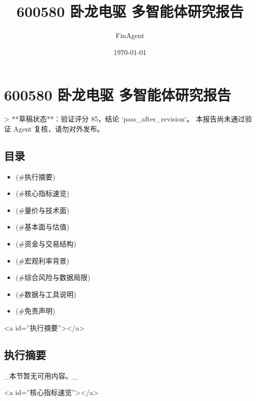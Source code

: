 \documentclass[12pt,a4paper]{article}
\title{600580 卧龙电驱 多智能体研究报告}
\author{FinAgent}
\date{\today}
\begin{document}
\maketitle
\tableofcontents
\newpage
\sloppy
\section{600580 卧龙电驱 多智能体研究报告}

> **草稿状态**：验证评分 85，结论 `pass\_after\_revision`。 本报告尚未通过验证 Agent 复核，请勿对外发布。

\subsection{ 目录}

\begin{itemize}
\item [执行摘要](\#执行摘要)
\item [核心指标速览](\#核心指标速览)
\item [量价与技术面](\#量价与技术面)
\item [基本面与估值](\#基本面与估值)
\item [资金与交易结构](\#资金与交易结构)
\item [宏观利率背景](\#宏观利率背景)
\item [综合风险与数据局限](\#综合风险与数据局限)
\item [数据与工具说明](\#数据与工具说明)
\item [免责声明](\#免责声明)
\end{itemize}

<a id=''执行摘要''></a>

\subsection{ 执行摘要}
\_本节暂无可用内容。\_

<a id=''核心指标速览''></a>
\end{document}
